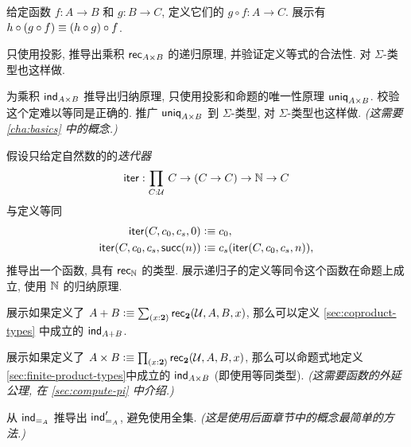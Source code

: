 \sectionExercises

\begin{ex}
    \label{ex:composition}
    给定函数 $f:A\to B$ 和 $g:B\to C$, 定义它们的
    $g\circ f:A\to C$.
    展示有 $h \circ (g\circ f) \equiv (h\circ g)\circ f$.
\end{ex}

\begin{ex}
    \label{ex:pr-to-rec}
    只使用投影, 推导出乘积 $\mathsf{rec}_{A\times B} $ 的递归原理, 并验证定义等式的合法性.
    对 $\Sigma$-类型也这样做.
\end{ex}

\begin{ex}
    \label{ex:pr-to-ind}
    为乘积 $\mathsf{ind}_{A\times B}$ 推导出归纳原理, 只使用投影和命题的唯一性原理 $\mathsf{uniq}_{A\times B}$.
    校验这个定难以等同是正确的.
    推广 $\mathsf{uniq}_{A\times B}$ 到 $\Sigma$-类型, 对 $\Sigma$-类型也这样做.
    \emph{(这需要 \cref{cha:basics} 中的概念.)}
\end{ex}

\begin{ex}
    \label{ex:iterator}
    假设只给定自然数的的\emph{迭代器}
    \[\ite : \prd{C:\UU} C \to (C \to C) \to \nat \to C \]
    与定义等同
    \begin{align*}
        \mathsf{iter}(C,c_0,c_s,0)  &\vcentcolon\equiv c_0, \\
        \mathsf{iter}(C,c_0,c_s,\mathsf{succ}(n)) &\vcentcolon\equiv c_s(\mathsf{iter}(C,c_0,c_s,n)),
    \end{align*}
    推导出一个函数, 具有 $\mathsf{rec}_{\mathbb{N}}$ 的类型.
    展示递归子的定义等同令这个函数在命题上成立, 使用 $\mathbb{N}$ 的归纳原理.
\end{ex}

\begin{ex}
    \label{ex:sum-via-bool}
    展示如果定义了 $A + B \defeq \sm{x:\bool} \rec{\bool}(\UU,A,B,x)$, 那么可以定义 \cref{sec:coproduct-types} 中成立的 $\mathsf{ind}_{A+B}$.
\end{ex}

\begin{ex}
    \label{ex:prod-via-bool}
    展示如果定义了 $A \times B \defeq \prd{x:\bool}\rec{\bool}(\UU,A,B,x)$, 那么可以命题式地定义\cref{sec:finite-product-types}中成立的 $\mathsf{ind}_{A\times B}$ (即使用等同类型).
    \emph{(这需要函数的外延公理, 在 \cref{sec:compute-pi} 中介绍.)}
\end{ex}

\begin{ex}
    \label{ex:pm-to-ml}
    从 $\mathsf{ind}_{=_{A}}$ 推导出 $\mathsf{ind}_{=_{A}}'$, 避免使用全集.
    \emph{(这是使用后面章节中的概念最简单的方法.)}
\end{ex}

